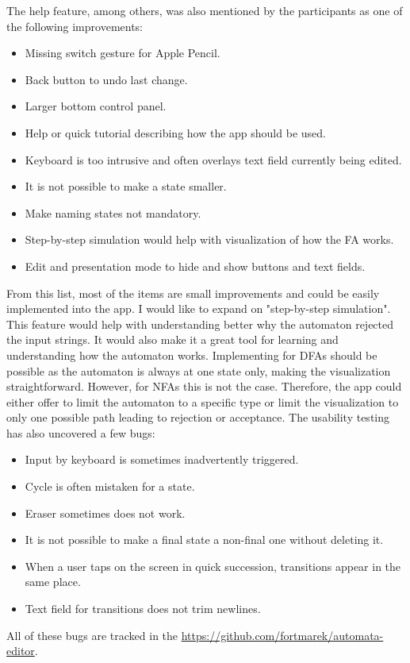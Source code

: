 The help feature, among others, was also mentioned by the participants as one of the following improvements:
\begin{itemize}
    \item Missing switch gesture for Apple Pencil.
    \item Back button to undo last change.
    \item Larger bottom control panel.
    \item Help or quick tutorial describing how the app should be used.
    \item Keyboard is too intrusive and often overlays text field currently being edited.
    \item It is not possible to make a state smaller.
    \item Make naming states not mandatory.
    \item Step-by-step simulation would help with visualization of how the FA works.
    \item Edit and presentation mode to hide and show buttons and text fields.
\end{itemize}
From this list, most of the items are small improvements and could be easily implemented into the app. I would like to expand on "step-by-step simulation". This feature would help with understanding better why the automaton rejected the input strings. It would also make it a great tool for learning and understanding how the automaton works. Implementing for DFAs should be possible as the automaton is always at one state only, making the visualization straightforward. However, for NFAs this is not the case. Therefore, the app could either offer to limit the automaton to a specific type or limit the visualization to only one possible path leading to rejection or acceptance. The usability testing has also uncovered a few bugs:
\begin{itemize}
    \item Input by keyboard is sometimes inadvertently triggered.
    \item Cycle is often mistaken for a state.
    \item Eraser sometimes does not work.
    \item It is not possible to make a final state a non-final one without deleting it.
    \item When a user taps on the screen in quick succession, transitions appear in the same place.
    \item Text field for transitions does not trim newlines.
\end{itemize}
All of these bugs are tracked in the \href{project's repository}{https://github.com/fortmarek/automata-editor}.

